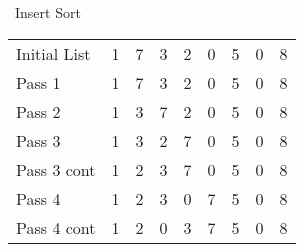 \documentclass{article}
\begin{document}
                                                                                                                                                                                                \ Insert Sort \\
                                                                                                                                                                                                        \begin{tabular}{l*{7}{c}r}
                                                                                                                                                                                                                Initial List & 1 & 7 & 3 & 2 & 0 & 5 & 0  & 8 \\
                                                                                                                                                                                                                        Pass 1       & 1 & 7 & 3 & 2 & 0 & 5 & 0  & 8 \\    
                                                                                                                                                                                                                                Pass 2       & 1 & 3 & 7 & 2 & 0 & 5 & 0  & 8 \\    
                                                                                                                                                                                                                                        Pass 3       & 1 & 3 & 2 & 7 & 0 & 5 & 0  & 8 \\    
                                                                                                                                                                                                                                                Pass 3 cont  & 1 & 2 & 3 & 7 & 0 & 5 & 0  & 8 \\
                                                                                                                                                                                                                                                        Pass 4       & 1 & 2 & 3 & 0 & 7 & 5 & 0  & 8 \\
                                                                                                                                                                                                                                                                Pass 4 cont  & 1 & 2 & 0 & 3 & 7 & 5 & 0  & 8 \\

\end{tabular}
\end{document}
